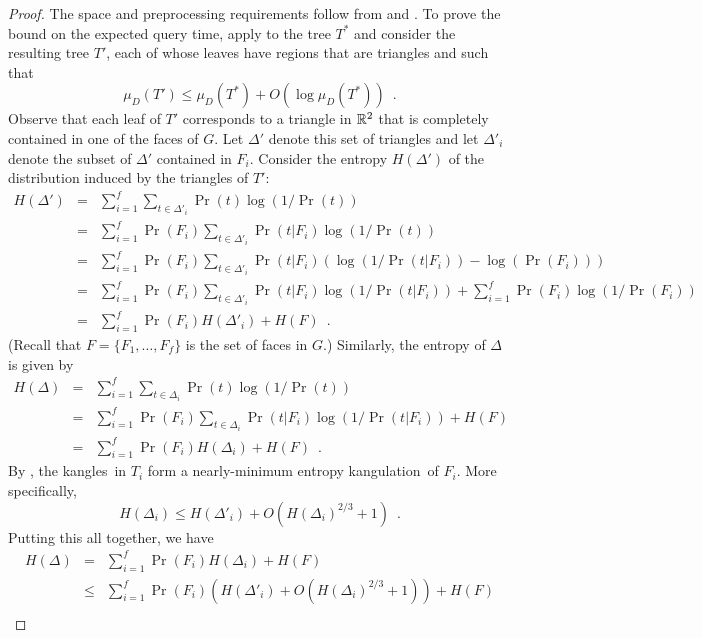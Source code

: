 \documentclass[charterfonts,lotsofwhite]{patmorin}
\newcommand{\kangles}{kangles}
\newcommand{\kangulation}{kangulation}
\begin{document}
\begin{proof}
The space and preprocessing requirements follow from
 and .
To prove the bound on the expected query time, apply
 to the tree $T^*$ and consider the resulting tree
$T'$, each of whose leaves have regions that are triangles and such
that
\[
     \mu_D(T') \le \mu_D(T^*) + O(\log \mu_D(T^*)) \enspace .
\]
Observe that each leaf of $T'$ corresponds to a triangle in $\mathbb{R}^2$
that is completely contained in one of the faces of $G$.  Let
$\Delta'$ denote this set of triangles and let $\Delta'_i$ denote the
subset of $\Delta'$ contained in $F_i$.
Consider the entropy $H(\Delta')$ of the distribution induced by the
triangles of $T'$:
\begin{eqnarray*}
   H(\Delta') 
     & = & \sum_{i=1}^f \sum_{t\in \Delta'_i}\Pr(t)\log(1/\Pr(t)) \\
     & = & \sum_{i=1}^f \Pr(F_i)\sum_{t\in \Delta'_i}
            \Pr(t|F_i)\log(1/\Pr(t)) \\
     & = & \sum_{i=1}^f \Pr(F_i)\sum_{t\in \Delta'_i}
            \Pr(t|F_i)
            \left(
              \log(1/\Pr(t|F_i))-\log(\Pr(F_i))
            \right) \\
     & = & \sum_{i=1}^f \Pr(F_i)\sum_{t\in \Delta'_i}
            \Pr(t|F_i)\log(1/\Pr(t|F_i)) 
          +
      \sum_{i=1}^f \Pr(F_i) \log(1/\Pr(F_i)) \\
     & = & \sum_{i=1}^f \Pr(F_i) H(\Delta'_i) + H(F) \enspace .
\end{eqnarray*}
(Recall that $F=\{F_1,\ldots,F_f\}$ is the set of faces in $G$.)
Similarly, the entropy of $\Delta$ is given by 
\begin{eqnarray*}
   H(\Delta) 
     & = & \sum_{i=1}^f \sum_{t\in \Delta_i}\Pr(t)\log(1/\Pr(t)) \\
     & = & \sum_{i=1}^f \Pr(F_i)\sum_{t\in \Delta_i}
            \Pr(t|F_i)\log(1/\Pr(t|F_i)) 
          + H(F) \\
     & = & \sum_{i=1}^f \Pr(F_i) H(\Delta_i) + H(F) \enspace .
\end{eqnarray*}
By , the \kangles\ in $T_i$ form a nearly-minimum
entropy \kangulation\ of $F_i$.  More specifically, 
\[  
   H(\Delta_i) \le H(\Delta'_i) + O(H(\Delta_i)^{2/3}+1)  \enspace .
\]
Putting this all together, we have
\begin{eqnarray*}
  H(\Delta) 
    &  =  & \sum_{i=1}^f\Pr(F_i) H(\Delta_i) + H(F) \\ 
    & \le & \sum_{i=1}^f\Pr(F_i) (H(\Delta'_i) + O(H(\Delta_i)^{2/3}+1)) + H(F) \\ 

\end{eqnarray*}
\end{proof}
\end{document}
